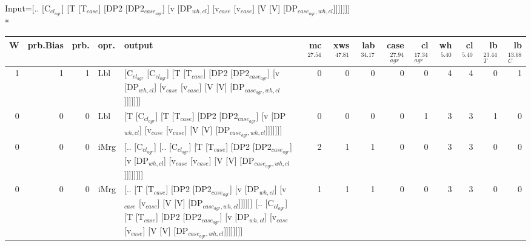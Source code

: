\begingroup\scriptsize Input=[.. [C$_{cl_{agr}}$] [T [T$_{case}$] [DP2 [DP2$_{case_{agr}}$] [v [DP$_{wh,cl}$] [v$_{case}$ [v$_{case}$] [V [V] [DP$_{case_{agr},wh,cl}$]]]]]]]\\*
\begin{tabularx}{\linewidth}{rrrlXrrrrrrrrr}
\hline
   W &   prb.Bias &   prb. & opr.   & output                                                                                                                                                                                                             &   mc$^{27.54}$ &   xws$^{47.81}$ &   lab$^{34.17}$ &   case$_{agr}^{27.94}$ &   cl$_{agr}^{17.34}$ &   wh$^{5.40}$ &   cl$^{5.40}$ &   lb$_{T}^{23.44}$ &   lb$_{C}^{13.68}$ \\
\hline
   1 &       1 &   1 & Lbl  & [C$_{cl_{agr}}$ [C$_{cl_{agr}}$] [T [T$_{case}$] [DP2 [DP2$_{case_{agr}}$] [v [DP$_{wh,cl}$] [v$_{case}$ [v$_{case}$] [V [V] [DP$_{case_{agr},wh,cl}$]]]]]]]                                                                                               &            0 &             0 &             0 &                  0 &                0 &           4 &           4 &              0 &              1 \\
   0 &       0 &   0 & Lbl  & [T [C$_{cl_{agr}}$] [T [T$_{case}$] [DP2 [DP2$_{case_{agr}}$] [v [DP$_{wh,cl}$] [v$_{case}$ [v$_{case}$] [V [V] [DP$_{case_{agr},wh,cl}$]]]]]]]                                                                                                      &            0 &             0 &             0 &                  0 &                1 &           3 &           3 &              1 &              0 \\
   0 &       0 &   0 & iMrg & [.. [C$_{cl_{agr}}$] [.. [C$_{cl_{agr}}$] [T [T$_{case}$] [DP2 [DP2$_{case_{agr}}$] [v [DP$_{wh,cl}$] [v$_{case}$ [v$_{case}$] [V [V] [DP$_{case_{agr},wh,cl}$]]]]]]]]                                                                                     &            2 &             1 &             1 &                  0 &                0 &           3 &           3 &              0 &              0 \\
   0 &       0 &   0 & iMrg & [.. [T [T$_{case}$] [DP2 [DP2$_{case_{agr}}$] [v [DP$_{wh,cl}$] [v$_{case}$ [v$_{case}$] [V [V] [DP$_{case_{agr},wh,cl}$]]]]]] [.. [C$_{cl_{agr}}$] [T [T$_{case}$] [DP2 [DP2$_{case_{agr}}$] [v [DP$_{wh,cl}$] [v$_{case}$ [v$_{case}$] [V [V] [DP$_{case_{agr},wh,cl}$]]]]]]]] &            1 &             1 &             1 &                  0 &                0 &           3 &           3 &              0 &              0 \\

\end{tabularx}

